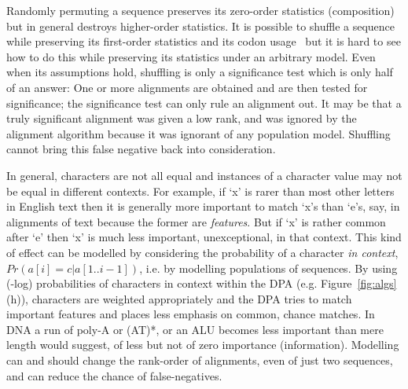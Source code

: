 \documentclass[a4paper,11pt,oneside]{article}
\begin{document}
Randomly permuting a sequence preserves its zero-order statistics (composition)
but in general destroys higher-order statistics.
It is possible to shuffle a sequence while preserving its first-order
statistics and its codon usage~\cite{fitch83, altschul85} but
it is hard to see how to do this while preserving its statistics under
an arbitrary model.
Even when its assumptions hold,
shuffling is only a significance test which is only half of an answer:
One or more alignments are obtained and are then tested for significance;
the significance test can only rule an alignment out.
It may be that a truly significant alignment was given a low rank,
and was ignored by the alignment algorithm because it was
ignorant of any population model.
Shuffling cannot bring this false negative back into consideration.

In general, characters are not all equal and instances of a character
value may not be equal in different contexts.
For example, if `x' is rarer than most other letters in English text
then it is generally more important to match `x's than `e's, say,
in alignments of text because the former are {\em features}.
But if `x' is rather common after `e'
then `x' is much less important, unexceptional, in that context.
This kind of effect can be modelled by considering the probability
of a character {\em in context}, $Pr(a[i]=c|a[1..i-1])$,
i.e. by modelling populations of sequences.
By using (-log) probabilities of characters in context within the DPA
(e.g. Figure~\ref{fig:algs}(h)), characters are weighted appropriately and the DPA tries
to match important features and places less emphasis on common, chance matches.
In DNA a run of poly-A or (AT)*, or an ALU becomes less important than
mere length would suggest, of less but not of zero importance (information).
Modelling can and should change the rank-order of alignments,
even of just two sequences, and can reduce the chance of false-negatives.
\end{document}
